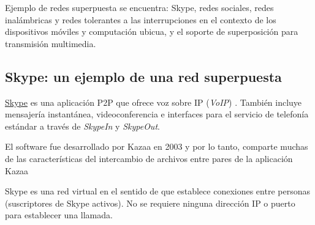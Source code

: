 {%
 
 
 Ejemplo de redes superpuesta se encuentra: Skype,   redes sociales, redes inalámbricas  y redes tolerantes a las interrupciones en el contexto de los dispositivos móviles y
 computación ubicua,  y  el  soporte de superposición para transmisión multimedia.
 
 \subsection{Skype: un ejemplo de una red superpuesta}
  \label{Skype}
 \href{https://www.skype.com}{Skype} es una aplicación P2P que ofrece voz sobre IP (\textit{VoIP}) \cite{Baset2006}. También incluye mensajería instantánea, videoconferencia e interfaces para el servicio de telefonía estándar a través de \textit{SkypeIn} y \textit{SkypeOut}.  
 
  
  \begin{tcolorbox}
  	[colback=red!5!white,colframe=red!75!black,fonttitle=\bfseries,title=  Skype]
  El software fue desarrollado por Kazaa en 2003 y por lo tanto, comparte muchas de las características del intercambio de archivos entre pares de la aplicaci\'on  Kazaa \cite{Leibowitz2003} 
  \end{tcolorbox}
  
  
 Skype es una red virtual en el sentido de que establece conexiones entre personas (suscriptores de Skype activos). No se requiere ninguna dirección IP o puerto para establecer una llamada.

}
